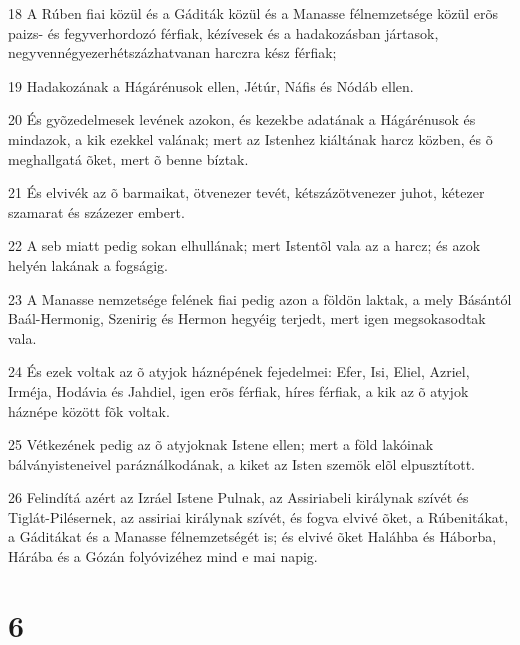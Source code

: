 \par 18 A Rúben fiai közül és a Gáditák közül és a Manasse félnemzetsége közül erõs paizs- és fegyverhordozó férfiak, kézívesek és a hadakozásban jártasok, negyvennégyezerhétszázhatvanan harczra kész férfiak;
\par 19 Hadakozának a Hágárénusok ellen, Jétúr, Náfis és Nódáb ellen.
\par 20 És gyõzedelmesek levének azokon, és kezekbe adatának a Hágárénusok és mindazok, a kik ezekkel valának; mert az Istenhez kiáltának harcz közben, és õ meghallgatá õket, mert õ benne bíztak.
\par 21 És elvivék az õ barmaikat, ötvenezer tevét, kétszázötvenezer juhot, kétezer szamarat és százezer embert.
\par 22 A seb miatt pedig sokan elhullának; mert Istentõl vala az a harcz; és azok helyén lakának a fogságig.
\par 23 A Manasse nemzetsége felének fiai pedig azon a földön laktak, a mely Básántól Baál-Hermonig, Szenirig és Hermon hegyéig terjedt, mert igen megsokasodtak vala.
\par 24 És ezek voltak az õ atyjok háznépének fejedelmei: Efer, Isi, Eliel, Azriel, Irméja, Hodávia és Jahdiel, igen erõs férfiak, híres férfiak, a kik az õ atyjok háznépe között fõk voltak.
\par 25 Vétkezének pedig az õ atyjoknak Istene ellen; mert a föld lakóinak bálványisteneivel paráználkodának, a kiket az Isten szemök elõl elpusztított.
\par 26 Felindítá azért az Izráel Istene Pulnak, az Assiriabeli királynak szívét és Tiglát-Pilésernek, az assiriai királynak szívét, és fogva elvivé õket, a Rúbenitákat, a Gáditákat és a Manasse félnemzetségét is; és elvivé õket Haláhba és Háborba, Hárába és a Gózán folyóvizéhez mind e mai napig.

\chapter{6}

